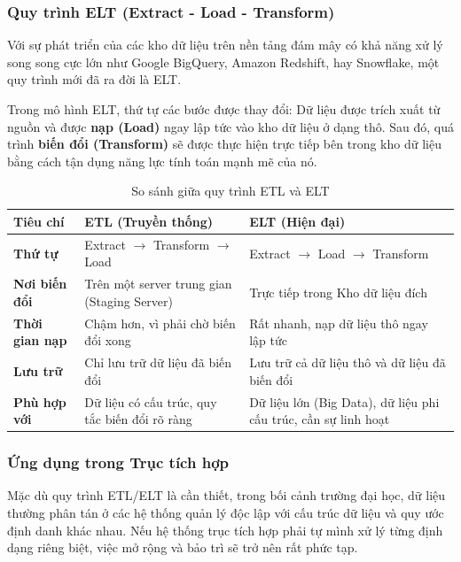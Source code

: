 \subsubsection{Quy trình ELT (Extract - Load - Transform)}
Với sự phát triển của các kho dữ liệu trên nền tảng đám mây có khả năng xử lý song song cực lớn như Google BigQuery, Amazon Redshift, hay Snowflake, một quy trình mới đã ra đời là ELT.

Trong mô hình ELT, thứ tự các bước được thay đổi: Dữ liệu được trích xuất từ nguồn và được \textbf{nạp (Load)} ngay lập tức vào kho dữ liệu ở dạng thô. Sau đó, quá trình \textbf{biến đổi (Transform)} sẽ được thực hiện trực tiếp bên trong kho dữ liệu bằng cách tận dụng năng lực tính toán mạnh mẽ của nó.

\begin{table}[h!]
    \centering
    \begin{tabular}{|l|p{5.5cm}|p{5.5cm}|}
        \hline
        \textbf{Tiêu chí} & \textbf{ETL (Truyền thống)} & \textbf{ELT (Hiện đại)} \\
        \hline
        \textbf{Thứ tự} & Extract \(\rightarrow\) Transform \(\rightarrow\) Load & Extract \(\rightarrow\) Load \(\rightarrow\) Transform \\
        \hline
        \textbf{Nơi biến đổi} & Trên một server trung gian (Staging Server) & Trực tiếp trong Kho dữ liệu đích \\
        \hline
        \textbf{Thời gian nạp} & Chậm hơn, vì phải chờ biến đổi xong & Rất nhanh, nạp dữ liệu thô ngay lập tức \\
        \hline
        \textbf{Lưu trữ} & Chỉ lưu trữ dữ liệu đã biến đổi & Lưu trữ cả dữ liệu thô và dữ liệu đã biến đổi \\
        \hline
        \textbf{Phù hợp với} & Dữ liệu có cấu trúc, quy tắc biến đổi rõ ràng & Dữ liệu lớn (Big Data), dữ liệu phi cấu trúc, cần sự linh hoạt \\
        \hline
    \end{tabular}
    \caption{So sánh giữa quy trình ETL và ELT}
    \label{tab:etl_vs_elt}
\end{table}

\subsubsection{Ứng dụng trong Trục tích hợp}

Mặc dù quy trình ETL/ELT là cần thiết, trong bối cảnh trường đại học, dữ liệu thường phân tán ở các hệ thống quản lý độc lập với cấu trúc dữ liệu và quy ước định danh khác nhau. Nếu hệ thống trục tích hợp phải tự mình xử lý từng định dạng riêng biệt, việc mở rộng và bảo trì sẽ trở nên rất phức tạp.

